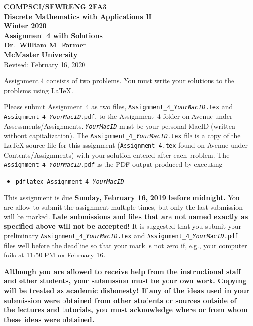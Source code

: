 \documentclass[11pt,fleqn]{article}
\begin{document}
\begin{center}

  {\large \textbf{COMPSCI/SFWRENG 2FA3}}\\[2mm]
  {\large \textbf{Discrete Mathematics with Applications II}}\\[2mm]
  {\large \textbf{Winter 2020}}\\[8mm]
  {\huge \textbf{Assignment 4 with Solutions}}\\[6mm]
  {\large \textbf{Dr.~William M. Farmer}}\\[2mm]
  {\large \textbf{McMaster University}}\\[6mm]
  {\large Revised: February 16, 2020}

\end{center}

\medskip

Assignment 4 consists of two problems.  You must write your solutions
to the problems using LaTeX.

Please submit Assignment~4 as two files,
\texttt{Assignment\_4\_\emph{YourMacID}.tex} and
\texttt{Assignment\_4\_\emph{YourMacID}.pdf}, to the Assignment~4
folder on Avenue under Assessments/Assignments.
\texttt{\emph{YourMacID}} must be your personal MacID (written without
capitalization).  The \texttt{Assignment\_4\_\emph{YourMacID}.tex}
file is a copy of the LaTeX source file for this assignment
(\texttt{Assignment\_4.tex} found on Avenue under
Contents/Assignments) with your solution entered after each problem.
The \texttt{Assignment\_4\_\emph{YourMacID}.pdf} is the PDF output
produced by executing

\begin{itemize}

  \item[] \texttt{pdflatex Assignment\_4\_\emph{YourMacID}}

\end{itemize}

This assignment is due \textbf{Sunday, February 16, 2019 before
  midnight.}  You are allow to submit the assignment multiple times,
but only the last submission will be marked.  \textbf{Late submissions
  and files that are not named exactly as specified above will not be
  accepted!}  It is suggested that you submit your preliminary
\texttt{Assignment\_4\_\emph{YourMacID}.tex} and
\texttt{Assignment\_4\_\emph{YourMacID}.pdf} files well before the
deadline so that your mark is not zero if, e.g., your computer fails
at 11:50 PM on February 16.

\textbf{Although you are allowed to receive help from the
  instructional staff and other students, your submission must be your
  own work.  Copying will be treated as academic dishonesty! If any of
  the ideas used in your submission were obtained from other students
  or sources outside of the lectures and tutorials, you must
  acknowledge where or from whom these ideas were obtained.}
\end{document}
